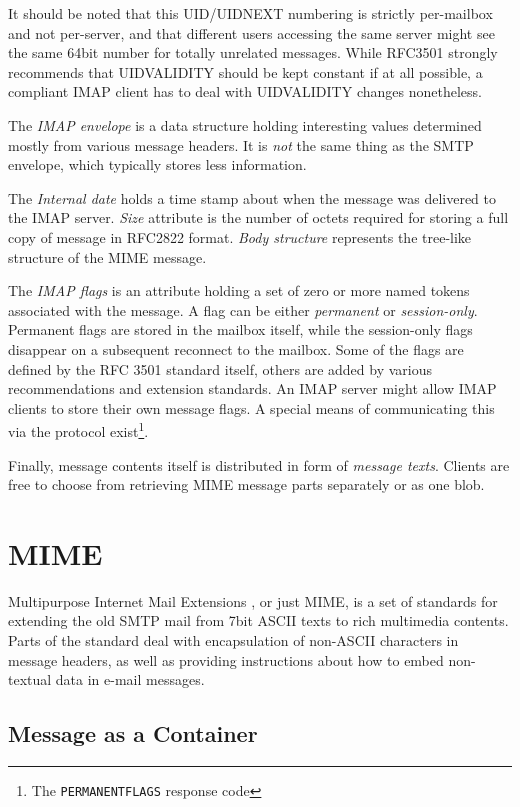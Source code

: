 \documentclass[12pt,notitlepage]{report}
\begin{document}
It should be noted that this UID/UIDNEXT numbering is strictly per-mailbox and
not per-server, and that different users accessing the same server might see the
same 64bit number for totally unrelated messages.  While RFC3501 \cite{rfc-imap}
strongly recommends that UIDVALIDITY should be kept constant if at all possible,
a compliant IMAP client has to deal with UIDVALIDITY changes nonetheless.

The \label{imap-envelope}{\em IMAP envelope} is a data structure holding
interesting values determined mostly from various message headers.  It is {\em
not} the same thing as the SMTP envelope, which typically stores less
information.

The {\em Internal date} holds a time stamp about when the message was delivered
to the IMAP server.  {\em Size} attribute is the number of octets required for
storing a full copy of message in RFC2822 format.  {\em Body structure}
represents the tree-like structure of the MIME message.

The \label{imap-msg-flags}{\em IMAP flags} is an attribute holding a set of zero
or more named tokens associated with the message.  A flag can be either {\em
permanent} or {\em session-only}.  Permanent flags are stored in the mailbox
itself, while the session-only flags disappear on a subsequent reconnect to the
mailbox.  Some of the flags are defined by the RFC 3501 standard itself, others
are added by various recommendations and extension standards.  An IMAP server
might allow IMAP clients to store their own message flags.  A special means of
communicating this via the protocol exist\footnote{The {\tt PERMANENTFLAGS}
response code}.

Finally, message contents itself is distributed in form of {\em message texts}.
Clients are free to choose from retrieving MIME message parts separately or as
one blob.

\section{MIME}

Multipurpose Internet Mail Extensions \cite{rfc-2045} \cite{rfc-2046}
\cite{rfc-2047}, or just MIME, is a set of standards for extending the old SMTP
mail from 7bit ASCII texts to rich multimedia contents.  Parts of the standard
deal with encapsulation of non-ASCII characters in message headers, as well as
providing instructions about how to embed non-textual data in e-mail messages.

\subsection{Message as a Container}
\end{document}

